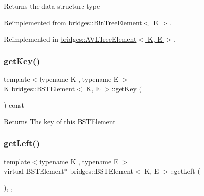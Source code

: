\begin{DoxyReturn}{Returns}
the data structure type 
\end{DoxyReturn}


Reimplemented from \hyperlink{classbridges_1_1_bin_tree_element_a0a154f68ef0a58715e598a6ef92b9e59}{bridges\+::\+Bin\+Tree\+Element$<$ E $>$}.



Reimplemented in \hyperlink{classbridges_1_1_a_v_l_tree_element_a24c005f8e07a7a2682225cead3b7e364}{bridges\+::\+A\+V\+L\+Tree\+Element$<$ K, E $>$}.

\hypertarget{classbridges_1_1_b_s_t_element_ae758ef6696535dadf44eb302b923dbfd}{}\label{classbridges_1_1_b_s_t_element_ae758ef6696535dadf44eb302b923dbfd} 
\subsubsection{\texorpdfstring{get\+Key()}{getKey()}}
{\footnotesize\ttfamily template$<$typename K , typename E $>$ \\
K \hyperlink{classbridges_1_1_b_s_t_element}{bridges\+::\+B\+S\+T\+Element}$<$ K, E $>$\+::get\+Key (\begin{DoxyParamCaption}{ }\end{DoxyParamCaption}) const\hspace{0.3cm}{\ttfamily [inline]}}

\begin{DoxyReturn}{Returns}
The key of this \hyperlink{classbridges_1_1_b_s_t_element}{B\+S\+T\+Element} 
\end{DoxyReturn}
\hypertarget{classbridges_1_1_b_s_t_element_a4d8987373c75b51fca94e3c0b78b87a6}{}\label{classbridges_1_1_b_s_t_element_a4d8987373c75b51fca94e3c0b78b87a6} 
\subsubsection{\texorpdfstring{get\+Left()}{getLeft()}\hspace{0.1cm}{\footnotesize\ttfamily [1/2]}}
{\footnotesize\ttfamily template$<$typename K , typename E $>$ \\
virtual \hyperlink{classbridges_1_1_b_s_t_element}{B\+S\+T\+Element}$\ast$ \hyperlink{classbridges_1_1_b_s_t_element}{bridges\+::\+B\+S\+T\+Element}$<$ K, E $>$\+::get\+Left (\begin{DoxyParamCaption}{ }\end{DoxyParamCaption})\hspace{0.3cm}{\ttfamily [inline]}, {\ttfamily [override]}, {\ttfamily [virtual]}}

